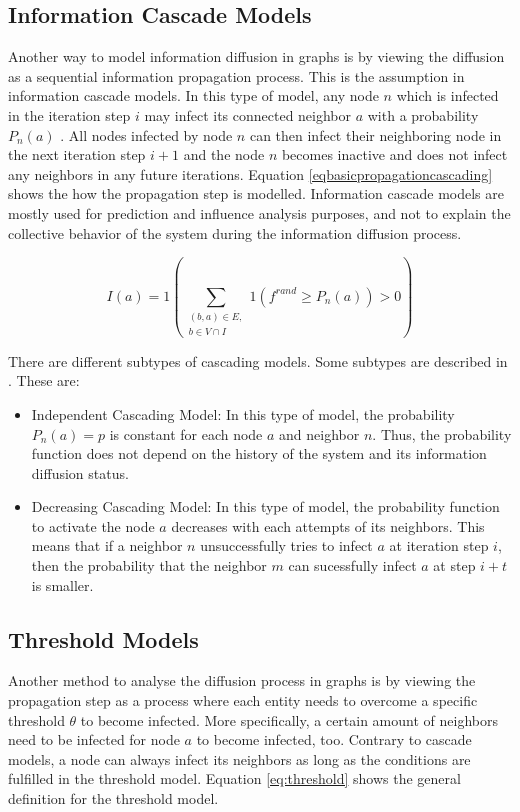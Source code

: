 \subsection{Information Cascade Models}

Another way to model information diffusion in graphs is by viewing the diffusion as a 
sequential information propagation process. This is the assumption in
information cascade models. In this type of model, any node $n$ which is infected in the
iteration step $i$ may infect its connected neighbor $a$ with a probability $P_n(a)$
\cite{reviewinformationdiffusion}. All nodes infected by node $n$
can then infect their neighboring node in the next iteration step $i+1$
and the node $n$ becomes inactive and does not infect any neighbors in any future
iterations.
Equation \ref{eqbasicpropagationcascading} 
shows the how the propagation step is modelled.
Information cascade models are mostly used for prediction and influence 
analysis purposes, and not to explain the collective behavior
of the system during the information diffusion process.

\begin{equation}
    I(a) = 1 (\sum\limits_{\substack{(b,a)\in E, \\ b \in V \cap I}}
    1(f^{rand}\geq P_n(a))>0) 
    \label{eqbasicpropagationcascading}
\end{equation}

There are different subtypes of cascading models.
Some subtypes are described in \cite{diffusionbasics}. These are:

\begin{itemize}
    \item Independent Cascading Model: In this type of model, the 
    probability $P_n(a)=p$ is constant for each node $a$ and neighbor $n$.
    Thus, the probability function does not depend on the history 
    of the system and its information diffusion status.
    \item Decreasing Cascading Model: In this type of model, the probability
    function to activate the node $a$ decreases with each attempts of its 
    neighbors. This means that if a neighbor $n$ unsuccessfully tries to infect
    $a$ at iteration step $i$, then the probability that the neighbor $m$
    can sucessfully infect $a$ at step $i+t$ is smaller.
\end{itemize}

\subsection{Threshold Models}
Another method to analyse the diffusion process in graphs is by viewing the
propagation step as a process where each entity needs to overcome a 
specific threshold $\theta$ to become infected. More specifically, 
a certain amount of neighbors need to be infected for node $a$ to become 
infected, too. Contrary to cascade models, a node can always 
infect its neighbors as long as the conditions are fulfilled in the threshold 
model. Equation \ref{eq:threshold} shows the general definition 
for the threshold model.

